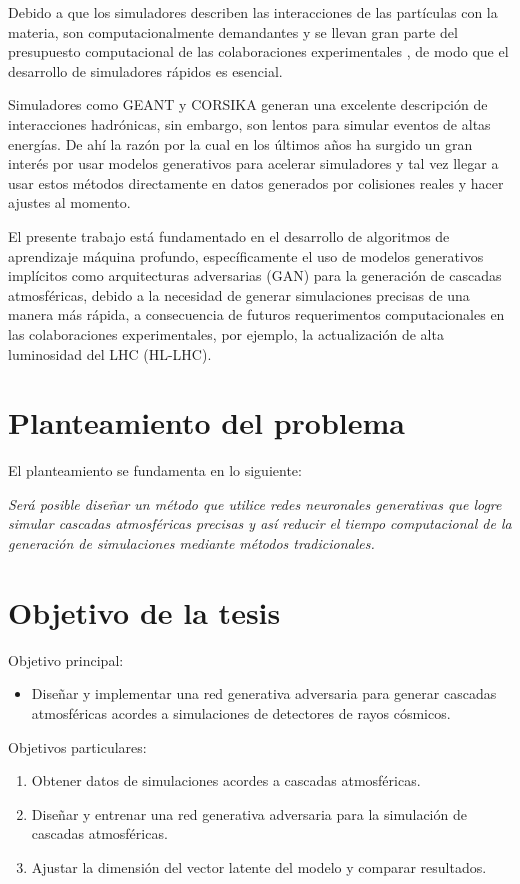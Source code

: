 Debido a que los simuladores describen las interacciones de las partículas con la materia, son computacionalmente demandantes y se llevan gran parte del presupuesto computacional de las colaboraciones experimentales \parencite{Elmer2017}, de modo que el desarrollo de simuladores rápidos es esencial.

Simuladores como GEANT y CORSIKA generan una excelente descripción de interacciones hadrónicas, sin embargo, son lentos para simular eventos de altas energías. De ahí la razón por la cual en los últimos años ha surgido un gran interés por usar modelos generativos para acelerar simuladores y tal vez llegar a usar estos métodos directamente en datos generados por colisiones reales y hacer ajustes al momento.

El presente trabajo está fundamentado en el desarrollo de algoritmos de aprendizaje máquina profundo, específicamente el uso de modelos generativos implícitos como arquitecturas adversarias (GAN) para la generación de cascadas atmosféricas, debido a la necesidad de generar simulaciones precisas de una manera más rápida, a consecuencia de futuros requerimentos computacionales en las colaboraciones experimentales, por ejemplo, la actualización de alta luminosidad del LHC (HL-LHC)\parencite{Elmer2017}.

\section{Planteamiento del problema}

El planteamiento se fundamenta en lo siguiente:

\emph{Será posible diseñar un método que utilice redes neuronales generativas que logre simular cascadas atmosféricas precisas y así reducir el tiempo computacional de la generación de simulaciones mediante métodos tradicionales.}


\section{Objetivo de la tesis}
Objetivo principal:
\begin{itemize}
   \item Diseñar y implementar una red generativa adversaria para generar cascadas atmosféricas acordes a simulaciones de detectores de rayos cósmicos.
\end{itemize}

Objetivos particulares:
\renewcommand{\theenumi}{\roman{enumi}}%
\begin{enumerate}
   \item Obtener datos de simulaciones acordes a cascadas atmosféricas.
   \item Diseñar y entrenar una red generativa adversaria para la simulación de cascadas atmosféricas.
   \item Ajustar la dimensión del vector latente del modelo y comparar resultados.
\end{enumerate}

